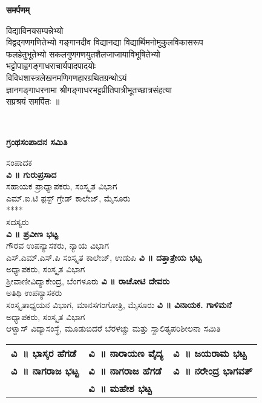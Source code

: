 \begin{mdframed}[roundcorner=10pt]
\phantom{i}
\medskip
{}
\centering
{\fontsize{16}{18}\selectfont
{\Large\bfseries समर्पणम्}
\bigskip

विद्याविनयसम्पन्नेभ्यो\\
विद्वद्गणगणितेभ्यो गङ्गानदीव विद्यानद्या विद्यार्थिमनोमुकुलविकासरूप\\
फलहेतुभूतेभ्यो सकलगुणगणयुतशैलजाजायाविभूषितेभ्यो\\   
भट्टोपाह्वगङ्गाधराचार्यपादपादयोः \\
विविधशास्त्रलेखनमणिगणहारग्रथितग्रन्थोऽयं\\
ज्ञानगङ्गाधरनामा श्रीगङ्गाधरभट्टप्रीतिपात्रीभूतच्छात्रसंहत्या\\
सप्रश्रयं समर्पितः ॥}
\bigskip
\phantom{i}
\end{mdframed}
\newpage
~\thispagestyle{empty}
\newpage
\vfill
\eject
\thispagestyle{empty}
\begin{center}
{\huge\bfseries ಗ್ರಂಥಸಂಪಾದನ ಸಮಿತಿ}
\vfill
{\Large ಸಂಪಾದಕ}\\
\bigskip
{\Large\bfseries ವಿ ॥ ಗುರುಪ್ರಸಾದ}\\
ಸಹಾಯಕ ಪ್ರಾಧ್ಯಾಪಕರು, ಸಂಸ್ಕೃತ ವಿಭಾಗ\\
ಎಮ್.ಐ.ಟಿ ಫ಼ಸ್ಟ್ ಗ್ರೇಡ್ ಕಾಲೇಜ್, ಮೈಸೂರು  \\
****\\
\vfill
{\large ಸದಸ್ಯರು}\\
\vfill
{\large\bfseries ವಿ ॥ ಪ್ರವೀಣ ಭಟ್ಟ}\\
ಗೌರವ ಉಪನ್ಯಾಸಕರು, ನ್ಯಾಯ ವಿಭಾಗ\\
ಎಸ್.ಎಮ್.ಎಸ್.ಪಿ ಸಂಸ್ಕೃತ ಕಾಲೇಜ್, ಉಡುಪಿ
\vfill
{\large\bfseries ವಿ ॥ ದತ್ತಾತ್ರೇಯ ಭಟ್ಟ}\\
ಅಧ್ಯಾಪಕರು, ಸಂಸ್ಕೃತ ವಿಭಾಗ\\
ಶ್ರೀವಾಣೀವಿದ್ಯಾಕೇಂದ್ರ, ಬೆಂಗಳೂರು
\vfill
{\large\bfseries ವಿ ॥ ರಾಚೋಟಿ ದೇವರು}\\
ಅತಿಥಿ ಉಪನ್ಯಾಸಕರು\\
ಸಂಸ್ಕೃತಾಧ್ಯಯನ ವಿಭಾಗ, ಮಾನಸಗಂಗೋತ್ರಿ, ಮೈಸೂರು
\vfill
{\large\bfseries ವಿ ॥ ವಿನಾಯಕ. ಗಾಳಿಮನೆ}\\
ಅಧ್ಯಾಪಕರು, ಸಂಸ್ಕೃತ ವಿಭಾಗ\\
ಆಳ್ವಾಸ್ ವಿದ್ಯಾಸಂಸ್ಥೆ, ಮೂಡುಬಿದರೆ
\vfill
{\large ಬೆರಳಚ್ಚು ಮತ್ತು ಸ್ಖಾಲಿತ್ಯಪರಿಶೀಲನಾ ಸಮಿತಿ}\\[4pt]
\begin{tabular}{@{}lll@{}}
{\bfseries ವಿ~॥ ಭಾಸ್ಕರ ಹೆಗಡೆ} & {\bfseries ವಿ~॥ ನಾರಾಯಣ ವೈದ್ಯ}  &{\bfseries ವಿ~॥ ಜಯರಾಮ ಭಟ್ಟ}\\			
{\bfseries ವಿ~॥ ನಾಗರಾಜ ಭಟ್ಟ} &{\bfseries ವಿ~॥ ನಾಗರಾಜ ಹೆಗಡೆ} &{\bfseries  ವಿ~॥ ನರೇಂದ್ರ ಭಾಗವತ್} \\
 & {\bfseries ವಿ~॥ ಮಹೇಶ ಭಟ್ಟ}
  
\end{tabular}
\end{center}

